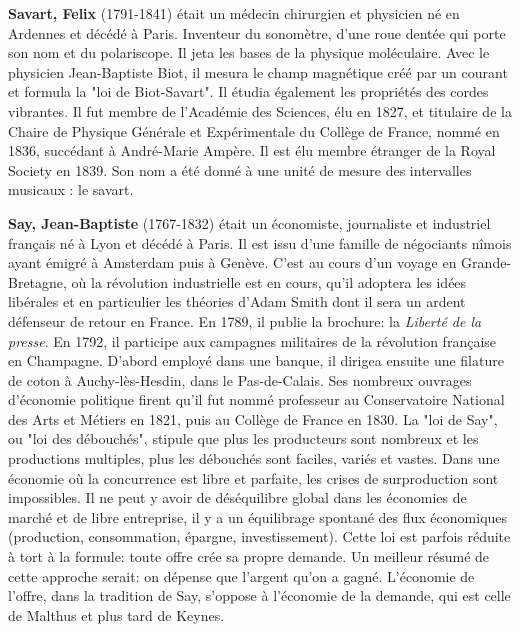 \textbf{Savart, Felix} (1791-1841) était un médecin chirurgien et physicien né en Ardennes et décédé à Paris. Inventeur du sonomètre, d'une roue dentée qui porte son nom et du polariscope. Il jeta les bases de la physique moléculaire. Avec le physicien Jean-Baptiste Biot, il mesura le champ magnétique créé par un courant et formula la "loi de Biot-Savart". Il étudia également les propriétés des cordes vibrantes. Il fut membre de l'Académie des Sciences, élu en 1827, et titulaire de la Chaire de Physique Générale et Expérimentale du Collège de France, nommé en 1836, succédant à André-Marie Ampère. Il est élu membre étranger de la Royal Society en 1839. Son nom a été donné à une unité de mesure des intervalles musicaux : le savart.

\textbf{Say, Jean-Baptiste} (1767-1832)  était un économiste, journaliste et industriel français né à Lyon et décédé à Paris. Il est issu d'une famille de négociants nîmois ayant émigré à Amsterdam puis à Genève. C'est au cours d'un voyage en Grande-Bretagne, où la révolution industrielle est en cours, qu'il adoptera les idées libérales et en particulier les théories d'Adam Smith dont il sera un ardent défenseur de retour en France. En 1789, il publie la brochure: la \textit{Liberté de la presse}. En 1792, il participe aux campagnes militaires de la révolution française en Champagne. D'abord employé dans une banque, il dirigea ensuite une filature de coton à Auchy-lès-Hesdin, dans le Pas-de-Calais. Ses nombreux ouvrages d'économie politique firent qu'il fut nommé professeur au Conservatoire National des Arts et Métiers en 1821, puis au Collège de France en 1830. La "loi de Say", ou "loi des débouchés", stipule que plus les producteurs sont nombreux et les productions multiples, plus les débouchés sont faciles, variés et vastes. Dans une économie où la concurrence est libre et parfaite, les crises de surproduction sont impossibles. Il ne peut y avoir de déséquilibre global dans les économies de marché et de libre entreprise, il y a un équilibrage spontané des flux économiques (production, consommation, épargne, investissement). Cette loi est parfois réduite à tort à la formule: toute offre crée sa propre demande. Un meilleur résumé de cette approche serait: on dépense que l'argent qu'on a gagné. L'économie de l'offre, dans la tradition de Say, s'oppose à l'économie de la demande, qui est celle de Malthus et plus tard de Keynes.


